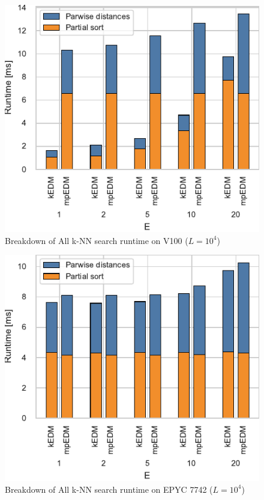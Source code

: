 \documentclass[conference]{IEEEtran}
\begin{document}
\begin{figure}
    \centering
    \includegraphics{figs/breakdown_knn_v100}
    \caption{Breakdown of All k-NN search runtime on V100 ($L=10^4$)}%
    \label{fig:breakdown-knn-v100}
\end{figure}

\begin{figure}
    \centering
    \includegraphics{figs/breakdown_knn_epyc}
    \caption{Breakdown of All k-NN search runtime on EPYC 7742 ($L=10^4$)}%
    \label{fig:breakdown-knn-epyc}
\end{figure}
\end{document}
